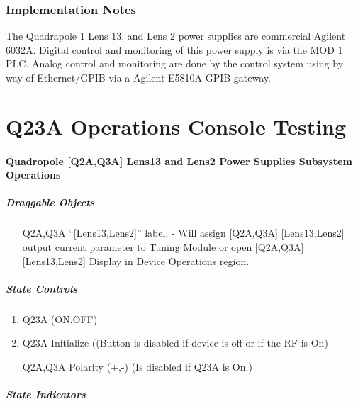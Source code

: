 \documentclass[11pt]{book}		%
\begin{document}
\subsection{Implementation Notes} \label{sect:cyc-equip-ctl-beamline-q23a-implementation}

The Quadrapole 1 Lens 13, and Lens 2 power supplies are commercial Agilent 6032A.  Digital control and monitoring of this power supply is via the MOD 1 PLC.  Analog control and monitoring are done by the control system using by way of Ethernet/GPIB via a Agilent E5810A GPIB gateway.




\chapter{Q23A Operations Console Testing}

\subsubsection{Quadropole [Q2A,Q3A] Lens13 and Lens2 Power Supplies Subsystem Operations}\label{sect:cyc-op-interface-ops-terminal-subsys-ops-mainline-q23a}

\paragraph{Draggable Objects}

\begin{enumerate}
 \item [Q2A,Q3A] ``[Lens13,Lens2]'' label. - Will assign [Q2A,Q3A] [Lens13,Lens2] output current parameter to Tuning Module or open [Q2A,Q3A] [Lens13,Lens2] Display in Device Operations region.
\end{enumerate}

\paragraph{State Controls}

\begin{enumerate}
 \item Q23A (ON,OFF)
 \item Q23A Initialize ((Button is disabled if device is off or if the RF is On)
 \item [Q2A,Q3A] Polarity (+,-) (Is disabled if Q23A is On.)
\end{enumerate}

\paragraph{State Indicators}
\end{document}
